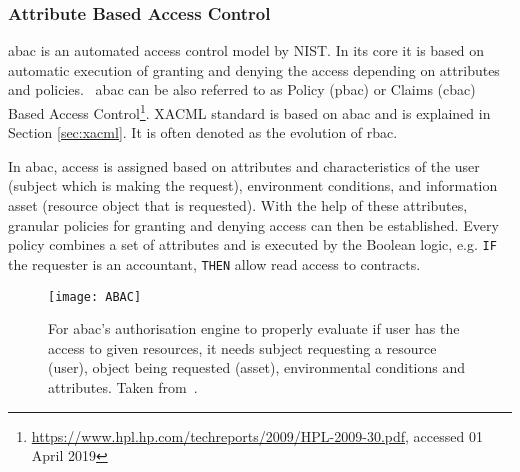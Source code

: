 \subsubsection{Attribute Based Access Control} \label{sec:sota-abac}

\acrfull{abac} is an automated access control model by NIST. In its core it is based on automatic execution of granting and denying the access depending on attributes and policies.~\cite{NISTAttributeControl} \acrshort{abac} can be also referred to as Policy (\acrshort{pbac}) or Claims (\acrshort{cbac}) Based Access Control\footnote{\url{https://www.hpl.hp.com/techreports/2009/HPL-2009-30.pdf}, accessed 01 April 2019}. XACML standard is based on \acrshort{abac} and is explained in Section \ref{sec:xacml}. It is often denoted as the evolution of \acrshort{rbac}.

In \acrshort{abac}, access is assigned based on attributes and characteristics of the user (subject which is making the request), environment conditions, and information asset (resource object that is requested). With the help of these attributes, granular policies for granting and denying access can then be established. Every policy combines a set of attributes and is executed by the Boolean logic, e.g. \texttt{IF} the requester is an accountant, \texttt{THEN} allow read access to contracts.

\begin{figure}[ht]
    \centering
    \texttt{[image: ABAC]}
    \caption{For \acrshort{abac}'s authorisation engine to properly evaluate if user has the access to given resources, it needs subject requesting a resource (user), object being requested (asset), environmental conditions and attributes. Taken from~\cite{AttributeABAC}.}
    \label{fig:ABAC_diagram_sota}
\end{figure}